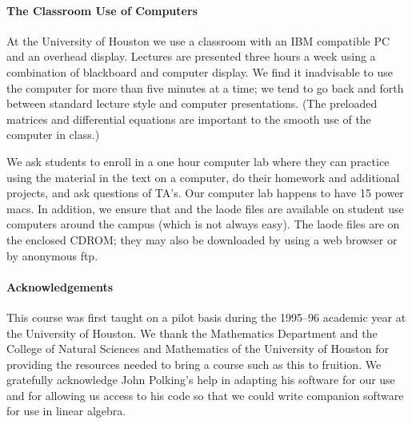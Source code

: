 \documentclass{ximera}
\begin{document}


\paragraph{The Classroom Use of Computers}  At the University of Houston we
use a classroom with an IBM compatible PC and an overhead display.  Lectures 
are presented three hours a week using a combination of blackboard and 
computer display.  We find it inadvisable to use the computer for more than 
five minutes at a time; we tend to go back and forth between standard lecture 
style and computer presentations.  (The preloaded matrices and differential 
equations are important to the smooth use of the computer in class.)  

We ask students to enroll in a one hour computer lab where they can practice 
using the material in the text on a computer, do their homework and additional
projects, and ask questions of TA's.  Our computer lab happens to have 15 
power macs.  In addition, we ensure that \Matlab and the {\sf laode} files are
available on student use computers around the campus (which is not always 
easy).  The {\sf laode} files are on the enclosed CDROM; they may also be 
downloaded by using a web browser or by anonymous ftp.

\paragraph{Acknowledgements} This course was first taught on a pilot
basis during the 1995--96 academic year at the University of Houston.
We thank the Mathematics Department and the College of Natural
Sciences and Mathematics of the University of Houston for providing
the resources needed to bring a course such as this to fruition.  We
gratefully acknowledge John Polking's help in adapting his software
for our use and for allowing us access to his code so that we could
write companion software for use in linear algebra.
\end{document}
